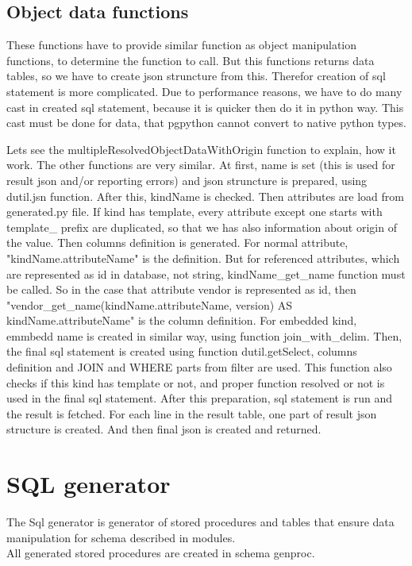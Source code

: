 \documentclass[deska]{subfiles}
\begin{document}
\subsection{Object data functions}
These functions have to provide similar function as object manipulation functions, to determine the function to call. But this functions returns data tables, so we have to create json struncture from this. Therefor creation of sql statement is more complicated. Due to performance reasons, we have to do many cast in created sql statement, because it is quicker then do it in python way. This cast must be done for data, that pgpython cannot convert to native python types.

Lets see the multipleResolvedObjectDataWithOrigin function to explain, how it work. The other functions are very similar.
At first, name is set (this is used for result json and/or reporting errors) and json struncture is prepared, using dutil.jsn function. After this, kindName is checked. Then attributes are load from generated.py file.
If kind has template, every attribute except one starts with template\_ prefix are duplicated, so that we has also information about origin of the value.
Then columns definition is generated. For normal attribute, "kindName.attributeName" is the definition. But for referenced attributes, which are
represented as id in database, not string, kindName\_get_name function must be called. So in the case that attribute vendor is represented as id, then
"vendor\_get\_name(kindName.attributeName, version) AS kindName.attributeName" is the column definition. For embedded kind, emmbedd name is created in similar way,
using function join\_with\_delim.
Then, the final sql statement is created using function dutil.getSelect, columns definition and JOIN and WHERE parts from filter are used.
This function also checks if this kind has template or not, and proper function resolved or not is used in the final sql statement.
After this preparation, sql statement is run and the result is fetched. For each line in the result table, one part of result json structure is
created. And then final json is created and returned.

\section{SQL generator}
The Sql generator is generator of stored procedures and tables that ensure data manipulation for schema described in modules.\\
All generated stored procedures are created in schema genproc.
\end{document}
